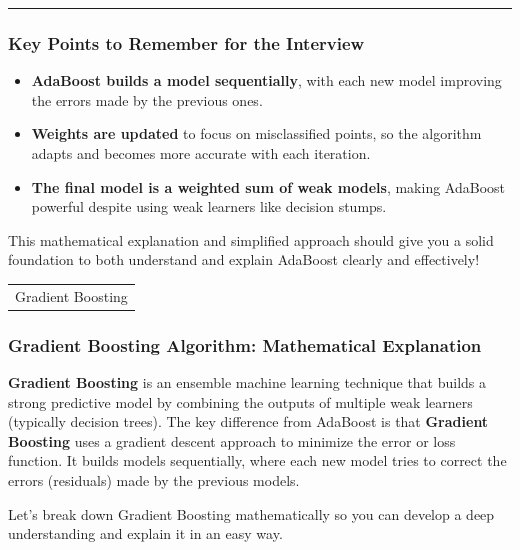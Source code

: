 \documentclass[12pt]{book}
\providecommand{\tightlist}{%
  \setlength{\itemsep}{0pt}\setlength{\parskip}{0pt}}
\begin{document}
\begin{center}\rule{0.5\linewidth}{0.5pt}\end{center}

\subsubsection{Key Points to Remember for the
Interview}\label{key-points-to-remember-for-the-interview}

\begin{itemize}
\tightlist
\item
  \textbf{AdaBoost builds a model sequentially}, with each new model
  improving the errors made by the previous ones.
\item
  \textbf{Weights are updated} to focus on misclassified points, so the
  algorithm adapts and becomes more accurate with each iteration.
\item
  \textbf{The final model is a weighted sum of weak models}, making
  AdaBoost powerful despite using weak learners like decision stumps.
\end{itemize}

This mathematical explanation and simplified approach should give you a
solid foundation to both understand and explain AdaBoost clearly and
effectively!

\begin{longtable}[]{@{}l@{}}
\toprule\noalign{}
\endhead
\bottomrule\noalign{}
\endlastfoot
Gradient Boosting \\
\end{longtable}

\subsubsection{Gradient Boosting Algorithm: Mathematical
Explanation}\label{gradient-boosting-algorithm-mathematical-explanation}

\textbf{Gradient Boosting} is an ensemble machine learning technique
that builds a strong predictive model by combining the outputs of
multiple weak learners (typically decision trees). The key difference
from AdaBoost is that \textbf{Gradient Boosting} uses a gradient descent
approach to minimize the error or loss function. It builds models
sequentially, where each new model tries to correct the errors
(residuals) made by the previous models.

Let's break down Gradient Boosting mathematically so you can develop a
deep understanding and explain it in an easy way.
\end{document}
